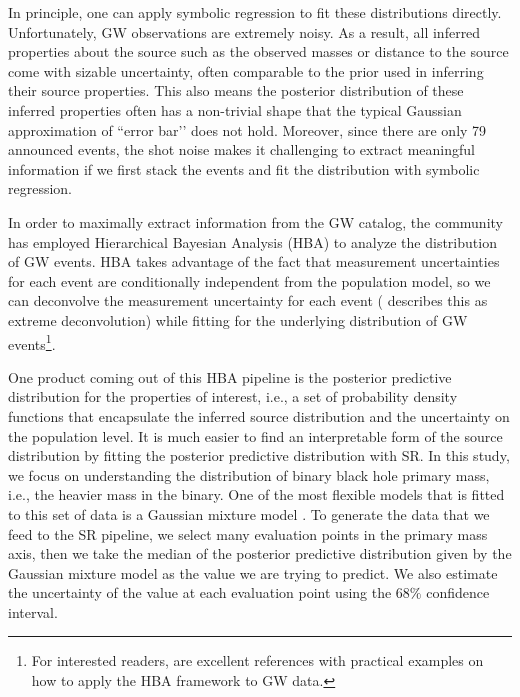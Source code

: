 \documentclass[nohyperref]{article}
\theoremstyle{plain}
\theoremstyle{definition}
\theoremstyle{remark}
\begin{document}
In principle, one can apply symbolic regression to fit these distributions directly.
Unfortunately, GW observations are extremely noisy. As a result, all inferred properties about the source such as the observed masses or distance to the source come with sizable uncertainty, often comparable to the prior used in inferring their source properties.
This also means the posterior distribution of these inferred properties often has a non-trivial shape that the typical Gaussian approximation of ``error bar’’ does not hold.
Moreover, since there are only 79 announced events, the shot noise makes it challenging to extract meaningful information if we first stack the events and fit the distribution with symbolic regression.

In order to maximally extract information from the GW catalog, the community has employed Hierarchical Bayesian Analysis (HBA) to analyze the distribution of GW events.
HBA takes advantage of the fact that measurement uncertainties for each event are conditionally independent from the population model, so we can deconvolve the measurement uncertainty for each event (\citealt{10.1214/10-AOAS439} describes this as extreme deconvolution) while fitting for the underlying distribution of GW events\footnote{For interested readers, \cite{Mandel:2018mve,Vitale:2020aaz,2019MNRAS.484.4008G} are excellent references with practical examples on how to apply the HBA framework to GW data.
}.

\newcommand\ppd{posterior predictive distribution\xspace} %
\newcommand{\defineppd}{} %

One product coming out of this HBA pipeline is the posterior predictive distribution \defineppd for the properties of interest, i.e., a set of probability density functions that encapsulate the inferred source distribution and the uncertainty on the population level.
It is much easier to find an interpretable form of the source distribution by fitting the \ppd with SR.
In this study, we focus on understanding the distribution of binary black hole primary mass, i.e., the heavier mass in the binary.
One of the most flexible models that is fitted to this set of data is a Gaussian mixture model \cite{Tiwari:2020vym}.
To generate the data that we feed to the SR pipeline,
we select many evaluation points in the primary mass axis,
then we take the median of the \ppd given by the Gaussian mixture model as the value we are trying to predict.
We also estimate the uncertainty of the value at each evaluation point using the $68\%$ confidence interval.
\end{document}

